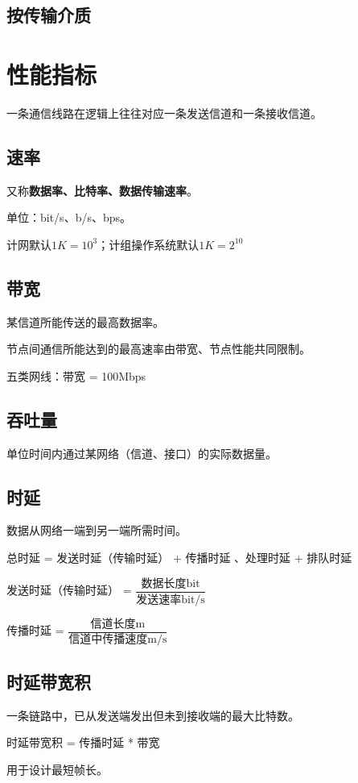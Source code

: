 \subsection{按传输介质}


\section{性能指标}
一条通信线路在逻辑上往往对应一条发送信道和一条接收信道。

\subsection{速率}
又称\textbf{数据率、比特率、数据传输速率}。

单位：bit/s、b/s、bps。

计网默认\(1K = 10^3\)；计组操作系统默认\(1K = 2^{10}\)



\subsection{带宽}
某信道所能传送的最高数据率。

节点间通信所能达到的最高速率由带宽、节点性能共同限制。

五类网线：带宽 = 100Mbps


\subsection{吞吐量}
单位时间内通过某网络（信道、接口）的实际数据量。


\subsection{时延}
数据从网络一端到另一端所需时间。

总时延 = 发送时延（传输时延） + 传播时延 、处理时延 + 排队时延

发送时延（传输时延） = \(\dfrac{\text{数据长度bit}}{\text{发送速率bit/s}}\)

传播时延 = \(\dfrac{\text{信道长度m}}{\text{信道中传播速度m/s}}\)


\subsection{时延带宽积}
一条链路中，已从发送端发出但未到接收端的最大比特数。

时延带宽积 = 传播时延 * 带宽

用于设计最短帧长。


